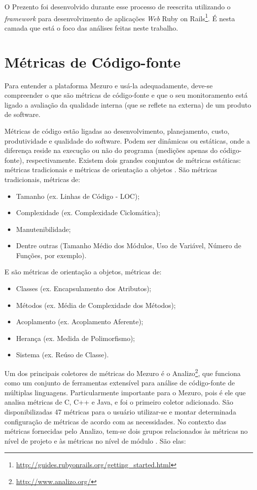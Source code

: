 O Prezento foi desenvolvido durante esse processo de reescrita utilizando o
\textit{framework} para desenvolvimento de aplicações \textit{Web} Ruby on
Rails\footnote{\url{http://guides.rubyonrails.org/getting_started.html}}.
%
É nesta camada que está o foco das análises feitas neste trabalho.

\section{Métricas de Código-fonte}

Para entender a plataforma Mezuro e usá-la adequadamente, deve-se compreender
o que são métricas de código-fonte e que o seu monitoramento está ligado a
avaliação da qualidade interna (que se reflete na externa) de um produto de
software.

Métricas de código estão ligadas ao desenvolvimento, planejamento, custo,
produtividade e qualidade do software. Podem ser dinâmicas ou estáticas, onde a
diferença reside na execução ou não do programa (medições apenas do código-fonte),
respectivamente. Existem dois grandes conjuntos de métricas estáticas:
métricas tradicionais e métricas de orientação a objetos
\cite{meirelles2013monitoramento}. São métricas tradicionais, métricas de:
\begin{itemize}
  \item Tamanho (ex. Linhas de Código - LOC);
  \item Complexidade (ex. Complexidade Ciclomática);
  \item Manutenibilidade;
  \item Dentre outras (Tamanho Médio dos Módulos, Uso de Variável, Número de
  Funções, por exemplo).
\end{itemize}
E são métricas de orientação a objetos, métricas de:
\begin{itemize}
  \item Classes (ex. Encapsulamento dos Atributos);
  \item Métodos (ex. Média de Complexidade dos Métodos);
  \item Acoplamento (ex. Acoplamento Aferente);
  \item Herança (ex. Medida de Polimorfismo);
  \item Sistema (ex. Reúso de Classe).
\end{itemize}

Um dos principais coletores de métricas do Mezuro é o Analizo\footnote{\url{http://www.analizo.org/}},
que funciona como um conjunto de ferramentas extensível para análise de
código-fonte de múltiplas linguagens. Particularmente importante para o Mezuro,
pois é ele que analisa métricas de C, C++ e Java, e foi o primeiro coletor
adicionado. São disponibilizadas 47 métricas para o usuário utilizar-se e montar
determinada configuração de métricas de acordo com as necessidades. No contexto
das métricas fornecidas pelo Analizo, tem-se dois grupos relacionados às
métricas no nível de projeto e às métricas no nível de módulo
\cite{terceiro2010analizo}. São elas:

